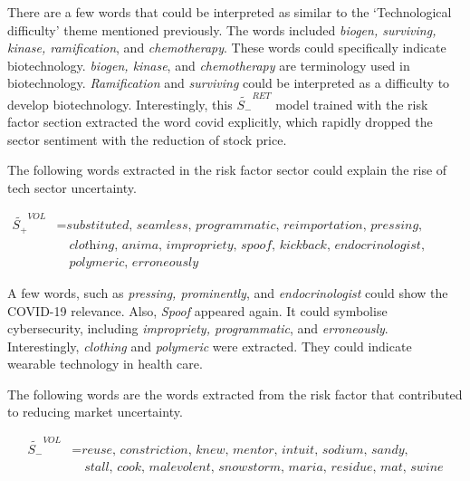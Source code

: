 \documentclass[logo,bsc,singlespacing,parskip]{infthesis}
\begin{document}
There are a few words that could be interpreted as similar to the ‘Technological difficulty’ theme mentioned previously. The words included \textit{biogen, surviving, kinase, ramification}, and \textit{chemotherapy}. These words could specifically indicate biotechnology. \textit{biogen, kinase}, and \textit{chemotherapy} are terminology used in biotechnology. \textit{Ramification} and \textit{surviving} could be interpreted as a difficulty to develop biotechnology. Interestingly, this $\tilde{S_{-}}^{RET}$ model trained with the risk factor section extracted the word covid explicitly, which rapidly dropped the sector sentiment with the reduction of stock price.

The following words extracted in the risk factor sector could explain the rise of tech sector uncertainty. 

\begin{align*}
\tilde{S_{+}}^{VOL} &= \textit{substituted, seamless, programmatic, reimportation, pressing, prominently} \\
               &\quad \textit{clothing, anima, impropriety, spoof, kickback, endocrinologist, educator,} \\
               &\quad \textit{polymeric, erroneously}
\end{align*}

A few words, such as \textit{pressing, prominently}, and \textit{endocrinologist} could show the COVID-19 relevance. Also, \textit{Spoof} appeared again. It could symbolise cybersecurity, including \textit{impropriety, programmatic}, and \textit{erroneously}. Interestingly, \textit{clothing} and \textit{polymeric} were extracted. They could indicate wearable technology in health care.

The following words are the words extracted from the risk factor that contributed to reducing market uncertainty. 

\begin{align*}
\tilde{S_{-}}^{VOL} &= \textit{reuse, constriction, knew, mentor, intuit, sodium, sandy, } \\
               &\quad \textit{stall, cook, malevolent, snowstorm, maria, residue, mat, swine} \\
\end{align*}

\end{document}
